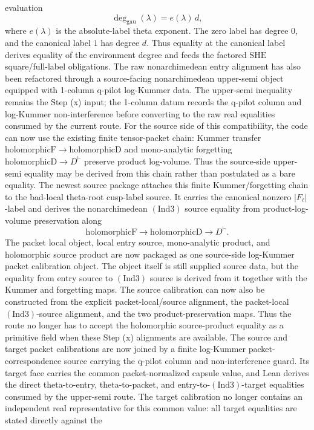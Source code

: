 \documentclass[11pt]{article}
\newcommand{\Lean}{Lean}
\newcommand{\Ind}{\ensuremath{\mathrm{Ind}}}
\newcommand{\SHE}{\ensuremath{\mathrm{SHE}}}
\theoremstyle{plain}
\theoremstyle{definition}
\theoremstyle{remark}
\begin{document}
evaluation
\[
  \deg_{\mathrm{gau}}(\lambda)
  = e(\lambda)\,d,
\]
where \(e(\lambda)\) is the absolute-label theta exponent.  The zero label has
degree \(0\), and the canonical label \(1\) has degree \(d\).  Thus equality at
the canonical label derives equality of the environment degree and feeds the
factored \SHE{} square/full-label obligations.
The raw nonarchimedean entry alignment has also been refactored through a
source-facing nonarchimedean upper-semi object equipped with 1-column q-pilot
log-Kummer data.  The upper-semi inequality remains the Step (x) input; the
1-column datum records the q-pilot column and log-Kummer non-interference
before converting to the raw real equalities consumed by the current route.
For the source side of this compatibility, the code can now use the existing
finite tensor-packet chain: Kummer transfer
\(\mathrm{holomorphicF}\to\mathrm{holomorphicD}\) and mono-analytic forgetting
\(\mathrm{holomorphicD}\to D^\vdash\) preserve product log-volume.  Thus the
source-side upper-semi equality may be derived from this chain rather than
postulated as a bare equality.
The newest source package attaches this finite Kummer/forgetting chain to the
bad-local theta-root cusp-label source.  It carries the canonical nonzero
\(|F_\ell|\)-label and derives the nonarchimedean \((\Ind3)\) source equality
from product-log-volume preservation along
\[
  \mathrm{holomorphicF}\to\mathrm{holomorphicD}\to D^\vdash .
\]
The packet local object, local entry source, mono-analytic product, and
holomorphic source product are now packaged as one source-side log-Kummer
packet calibration object.  The object itself is still supplied source data,
but the equality from entry source to \((\Ind3)\) source is derived from it
together with the Kummer and forgetting maps.
The source calibration can now also be constructed from the explicit
packet-local/source alignment, the packet-local \((\Ind3)\)-source alignment,
and the two product-preservation maps.  Thus the route no longer has to accept
the holomorphic source-product equality as a primitive field when these
Step (x) alignments are available.
The source and target packet calibrations are now joined by a finite
log-Kummer packet-correspondence source carrying the q-pilot column and
non-interference guard.  Its target face carries the common packet-normalized
capsule value, and \Lean{} derives the direct theta-to-entry, theta-to-packet,
and entry-to-\((\Ind3)\)-target equalities consumed by the upper-semi route.
The target calibration no longer contains an independent real representative
for this common value: all target equalities are stated directly against the
\end{document}
